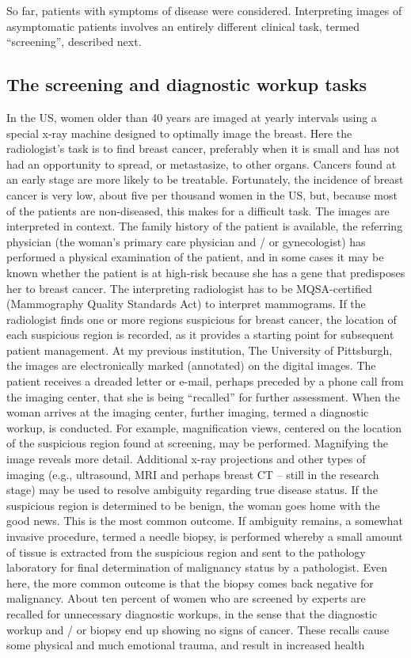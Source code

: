 \documentclass[
]{book}
\begin{document}
So far, patients with symptoms of disease were considered. Interpreting images of asymptomatic patients involves an entirely different clinical task, termed ``screening'', described next.

\hypertarget{the-screening-and-diagnostic-workup-tasks}{%
\subsection{The screening and diagnostic workup tasks}\label{the-screening-and-diagnostic-workup-tasks}}

In the US, women older than 40 years are imaged at yearly intervals using a special x-ray machine designed to optimally image the breast. Here the radiologist's task is to find breast cancer, preferably when it is small and has not had an opportunity to spread, or metastasize, to other organs. Cancers found at an early stage are more likely to be treatable. Fortunately, the incidence of breast cancer is very low, about five per thousand women in the US, but, because most of the patients are non-diseased, this makes for a difficult task. The images are interpreted in context. The family history of the patient is available, the referring physician (the woman's primary care physician and / or gynecologist) has performed a physical examination of the patient, and in some cases it may be known whether the patient is at high-risk because she has a gene that predisposes her to breast cancer. The interpreting radiologist has to be MQSA-certified (Mammography Quality Standards Act) to interpret mammograms. If the radiologist finds one or more regions suspicious for breast cancer, the location of each suspicious region is recorded, as it provides a starting point for subsequent patient management. At my previous institution, The University of Pittsburgh, the images are electronically marked (annotated) on the digital images. The patient receives a dreaded letter or e-mail, perhaps preceded by a phone call from the imaging center, that she is being ``recalled'' for further assessment. When the woman arrives at the imaging center, further imaging, termed a diagnostic workup, is conducted. For example, magnification views, centered on the location of the suspicious region found at screening, may be performed. Magnifying the image reveals more detail. Additional x-ray projections and other types of imaging (e.g., ultrasound, MRI and perhaps breast CT -- still in the research stage) may be used to resolve ambiguity regarding true disease status. If the suspicious region is determined to be benign, the woman goes home with the good news. This is the most common outcome. If ambiguity remains, a somewhat invasive procedure, termed a needle biopsy, is performed whereby a small amount of tissue is extracted from the suspicious region and sent to the pathology laboratory for final determination of malignancy status by a pathologist. Even here, the more common outcome is that the biopsy comes back negative for malignancy. About ten percent of women who are screened by experts are recalled for unnecessary diagnostic workups, in the sense that the diagnostic workup and / or biopsy end up showing no signs of cancer. These recalls cause some physical and much emotional trauma, and result in increased health 
\end{document}
